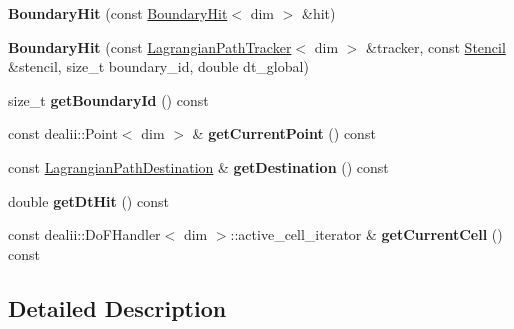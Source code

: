 \begin{DoxyCompactItemize}
\item 
\hypertarget{structnatrium_1_1BoundaryHit_af4c88d91789f99fced8d8d3b4cd7ebbc}{
{\bfseries BoundaryHit} (const \hyperlink{structnatrium_1_1BoundaryHit}{BoundaryHit}$<$ dim $>$ \&hit)}
\label{structnatrium_1_1BoundaryHit_af4c88d91789f99fced8d8d3b4cd7ebbc}

\item 
\hypertarget{structnatrium_1_1BoundaryHit_a2804aa93a7f03d12ec28415b42aa12ee}{
{\bfseries BoundaryHit} (const \hyperlink{structnatrium_1_1LagrangianPathTracker}{LagrangianPathTracker}$<$ dim $>$ \&tracker, const \hyperlink{classnatrium_1_1Stencil}{Stencil} \&stencil, size\_\-t boundary\_\-id, double dt\_\-global)}
\label{structnatrium_1_1BoundaryHit_a2804aa93a7f03d12ec28415b42aa12ee}

\item 
\hypertarget{structnatrium_1_1BoundaryHit_a4f20976b5fb57874538448907dbdad3d}{
size\_\-t {\bfseries getBoundaryId} () const }
\label{structnatrium_1_1BoundaryHit_a4f20976b5fb57874538448907dbdad3d}

\item 
\hypertarget{structnatrium_1_1BoundaryHit_a4ff918c172f0cb36cfc64480f68762e1}{
const dealii::Point$<$ dim $>$ \& {\bfseries getCurrentPoint} () const }
\label{structnatrium_1_1BoundaryHit_a4ff918c172f0cb36cfc64480f68762e1}

\item 
\hypertarget{structnatrium_1_1BoundaryHit_ab7467ce964ae4abd864aecabf1f9d414}{
const \hyperlink{structnatrium_1_1LagrangianPathDestination}{LagrangianPathDestination} \& {\bfseries getDestination} () const }
\label{structnatrium_1_1BoundaryHit_ab7467ce964ae4abd864aecabf1f9d414}

\item 
\hypertarget{structnatrium_1_1BoundaryHit_aa12ef41734a2e7e64e4f9cce6f517f36}{
double {\bfseries getDtHit} () const }
\label{structnatrium_1_1BoundaryHit_aa12ef41734a2e7e64e4f9cce6f517f36}

\item 
\hypertarget{structnatrium_1_1BoundaryHit_aed98a3af2ad2340721c6d4c48b3e89d8}{
const dealii::DoFHandler$<$ dim $>$::active\_\-cell\_\-iterator \& {\bfseries getCurrentCell} () const }
\label{structnatrium_1_1BoundaryHit_aed98a3af2ad2340721c6d4c48b3e89d8}

\end{DoxyCompactItemize}


\subsection{Detailed Description}
